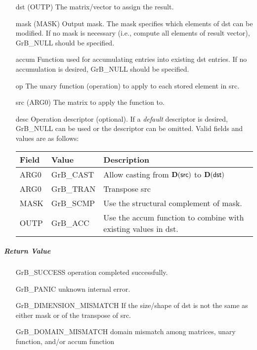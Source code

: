 \begin{itemize}[leftmargin=1.1in]
    \item[{\sf dst}]   ({\sf OUTP}) The matrix/vector to assign the result.

    \item[{\sf mask}] ({\sf MASK}) Output mask. The mask
    specifies which elements of {\sf dst} can be modified.
    If no mask is necessary (i.e., compute all elements of result
    vector), {\sf GrB\_NULL} should be specified.

    \item[{\sf accum}]  Function used for accumulating entries into existing {\sf dst} entries. 
			If no accumulation is desired, {\sf GrB\_NULL} should be specified.

    \item[{\sf op}]    The unary function (operation) to apply to each stored element in src.
    \item[{\sf src}]   ({\sf ARG0}) The matrix to apply the function to.
    \item[{\sf desc}]   Operation descriptor (optional). If a
    \emph{default} descriptor is desired, {\sf GrB\_NULL} can be
    used or the descriptor can be omitted.  Valid fields and values are as follows: \\
    \begin{tabular}{lll}
    Field  & Value & Description \\
    \hline
    {\sf ARG0} & {\sf GrB\_CAST} & Allow casting from $\bold{D}({\sf src})$ to $\bold{D}({\sf dst})$ \\
    {\sf ARG0} & {\sf GrB\_TRAN} & Transpose {\sf src} \\
    {\sf MASK} & {\sf GrB\_SCMP} & Use the structural complement of {\sf mask}. \\
    {\sf OUTP}& {\sf GrB\_ACC}  & Use the {\sf accum} function to combine with existing values in {\sf dst}.\\
    \end{tabular}
\end{itemize}

\subparagraph{Return Value}


\begin{itemize}[leftmargin=2.1in]
\item[{\sf GrB\_SUCCESS}]     operation completed successfully.
\item[{\sf GrB\_PANIC}]        unknown internal error.
\item[{\sf GrB\_DIMENSION\_MISMATCH}]            
        If the size/shape of dst is not the same as either mask or
        of the transpose of src.
\item[{\sf GrB\_DOMAIN\_MISMATCH}]  
        domain mismatch among matrices, unary function, and/or
        accum function 
\end{itemize}


